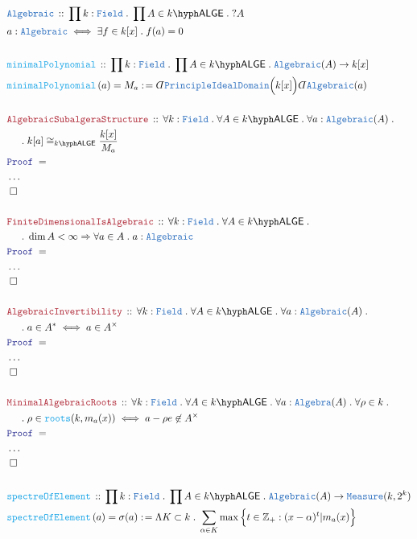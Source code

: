 \documentclass[12pt]{scrartcl}%
\newcommand{\TYPE}[1]{\textcolor{NavyBlue}{\mathtt{#1}}}%
\newcommand{\FUNC}[1]{\textcolor{Cerulean}{\mathtt{#1}}}%
\newcommand{\LOGIC}[1]{\textcolor{Blue}{\mathtt{#1}}}%
\newcommand{\THM}[1]{\textcolor{Maroon}{\mathtt{#1}}}%
\renewcommand{\.}{\; . \;} %
\newcommand{\de}{: \kern 0.1pc =} %
\newcommand{\Act}[1]{\left( #1 \right)} %
\newcommand{\Theorem}[2]{& \THM{#1} \, :: \, #2 \\ & \Proof = \\ } %
\newcommand{\DeclareType}[2]{& \TYPE{#1} \, :: \, #2 \\}%
\newcommand{\DefineType}[3]{& #1 : \TYPE{#2} \iff #3 \\}%
\newcommand{\DeclareFunc}[2]{& \FUNC{#1} \, :: \, #2 \\}%
\newcommand{\DefineNamedFunc}[4]{&  \FUNC{#1}\Act{#2} = #3 \de #4 \\}%
\newcommand{\NewLine}{\\ & \kern 1pc}%
\newcommand{\Page}[1]{ \begin{align*} #1 \end{align*}  }%
\newcommand{ \bd }{ \ByDef }%
\newcommand{\NoProof}{ & \ldots \\ \EndProof}%
\newcommand{\Int}{\mathbb{Z}}%
\newcommand{\QED}{\; \square} %
\newcommand{\EndProof}{& \QED \\} %
\newcommand{\ByDef}{\rotatebox[origin=c]{-180}{$D$}}%
\newcommand{\Proof}{\LOGIC{Proof} \; } %
\newcommand{\Field}{\TYPE{Field}}
\newcommand{\PID}{\TYPE{PrincipleIdealDomain}}
\newcommand{\LALGE}[1]{#1\hyph\mathsf{ALGE}}%
\begin{document}
\Page{
	\DeclareType{Algebraic}{ \prod k : \Field \. \prod A \in \LALGE{k} \. ?A }
	\DefineType{a}{Algebraic}{ \exists f \in k[x]  \. f(a) = 0  } 
	\\
	\DeclareFunc{minimalPolynomial}{ \prod k : \Field \. \prod A \in \LALGE{k} \. \TYPE{Algebraic}(A) \to k[x] }
	\DefineNamedFunc{minimalPolynomial}{a}{M_a}{ \bd \PID\Big(k[x]\Big) \bd \TYPE{Algebraic}(a) }
	\\
	\Theorem{AlgebraicSubalgeraStructure}{ 
		\forall k : \Field \. 
		\forall A \in \LALGE{k} \. 
		\forall a : \TYPE{Algebraic}(A) \. \NewLine \. 
		k[a] \cong_{\LALGE{k}} \frac{k[x]}{M_a}
	}
	\NoProof
	\\
	\Theorem{FiniteDimensionalIsAlgebraic}
	{
		\forall k : \Field \. 
		\forall A \in \LALGE{k} \. \NewLine \.
		\dim A < \infty \Rightarrow \forall a \in A \. a : \TYPE{Algebraic}
	}
	\NoProof
	\\
	\Theorem{AlgebraicInvertibility}
	{
		\forall k : \Field \.
		\forall A \in \LALGE{k} \. 
		\forall a : \TYPE{Algebraic}(A) \. \NewLine \. 
		a \in A^* \iff a \in A^\times 
	}
	\NoProof
	\\
	\Theorem{MinimalAlgebraicRoots}
	{
		\forall k : \Field \.
		\forall A \in \LALGE{k} \.
		\forall a : \TYPE{Algebra}(A) \.  
		\forall \rho \in k \.\NewLine  \. 
		\rho \in \FUNC{roots}(k,m_a(x)) \iff 
		a - \rho e \not \in A^\times
	}
	\NoProof
	\\
	\DeclareFunc{spectreOfElement}
	{
		\prod k : \Field \.
		\prod A \in \LALGE{k} \.
		\TYPE{Algebraic}(A) \to \TYPE{Measure}(k,2^k) 
	}
	\DefineNamedFunc{spectreOfElement}{a}{\sigma(a)}{ \Lambda K \subset k \. \sum_{\alpha \in K} \max \Big\{ t \in \Int_+ : (x - \alpha)^t | m_a(x)  \Big\}  }
}
\end{document}
